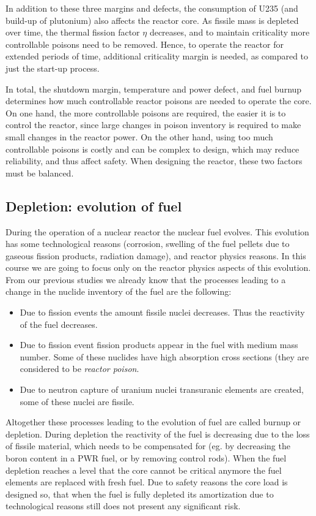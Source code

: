 In addition to these three margins and defects, the consumption of U235 (and build-up of plutonium) also affects the reactor core. As fissile mass is depleted over time, the thermal fission factor $\eta$ decreases, and to maintain criticality more controllable poisons need to be removed. Hence, to operate the reactor for extended periods of time, additional criticality margin is needed, as compared to just the start-up process.

In total, the shutdown margin, temperature and power defect, and fuel burnup determines how much controllable reactor poisons are needed to operate the core. On one hand, the more controllable poisons are required, the easier it is to control the reactor, since large changes in poison inventory is required to make small changes in the reactor power. On the other hand, using too much controllable poisons is costly and can be complex to design, which may reduce reliability, and thus affect safety. When designing the reactor, these two factors must be balanced.


\subsection{Depletion: evolution of fuel}

During the operation of a nuclear reactor the nuclear fuel evolves. This evolution has some technological reasons (corrosion, swelling of the fuel pellets due to gaseous fission products, radiation damage), and reactor physics reasons. In this course we are going to focus only on the reactor physics aspects of this evolution. From our previous studies we already know that the processes leading to a change in the nuclide inventory of the fuel are the following:

\begin{itemize}
\item Due to fission events the amount fissile nuclei decreases. Thus the reactivity of the fuel decreases.
\item Due to fission event fission products appear in the fuel with medium mass number. Some of these nuclides have high absorption cross sections (they are considered to be \textit{reactor poison}.
\item Due to neutron capture of uranium nuclei transuranic elements are created, some of these nuclei are fissile.
\end{itemize}

Altogether these processes leading to the evolution of fuel are called burnup or depletion. During depletion the reactivity of the fuel is decreasing due to the loss of fissile material, which needs to be compensated for (eg. by decreasing the boron content in a PWR fuel, or by removing control rods). When the fuel depletion reaches a level that the core cannot be critical anymore the fuel elements are replaced with fresh fuel. Due to safety reasons the core load is designed so, that when the fuel is fully depleted its amortization due to technological reasons still does not present any significant risk.


